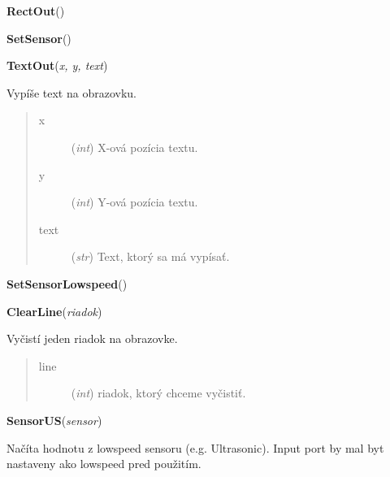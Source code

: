 \documentclass[10pt,a4paper]{article}
\begin{document}
 

\vspace{6pt}
{\bf RectOut}({\it }) 

 

\vspace{6pt}
{\bf SetSensor}({\it }) 

 

\vspace{6pt}
{\bf TextOut}({\it x, y, text}) 
    
    Vypíše text na obrazovku.
    



    

\begin{quote}
    \begin{description}
        
\item[x] ({\emph{int}}) X-ová pozícia textu.

\item[y] ({\emph{int}}) Y-ová pozícia textu.

\item[text] ({\emph{str}}) Text, ktorý sa má vypísať.

    \end{description}
\end{quote}

 

\vspace{6pt}
{\bf SetSensorLowspeed}({\it }) 

 

\vspace{6pt}
{\bf ClearLine}({\it riadok}) 
    
    Vyčistí jeden riadok na obrazovke.
    

    

\begin{quote}
    \begin{description}
        
\item[line] ({\emph{int}}) riadok, ktorý chceme vyčistiť.

    \end{description}
\end{quote}

 

\vspace{6pt}
{\bf SensorUS}({\it sensor}) 

    Načíta hodnotu z lowspeed sensoru (e.g. Ultrasonic). Input port
    by mal byt nastaveny ako lowspeed pred použitím.
    
\end{document}
